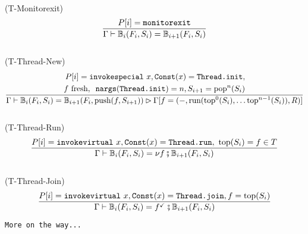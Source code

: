\documentclass{amsart}
\newcommand{\bB}[1]{\mathbb{B}_{#1}}
\newcommand{\Const}{\texttt{Const}}
\numberwithin{equation}{section}
\theoremstyle{plain} %
\theoremstyle{definition}
\theoremstyle{remark}
\begin{document}
\\
(T-Monitorexit)
\begin{equation*}
\frac{P[i] = \text{\texttt{monitorexit}}}
{\Gamma \vdash \bB{i}(F_i, S_i) = \bB{i+1}(F_i, S_i)}
\end{equation*}
\\
(T-Thread-New)
\begin{equation*}
\frac{\begin{aligned}
P[i] = \text{\texttt{invokespecial} } x, \Const{}(x) = \texttt{Thread.init},\\
f \text{ fresh}, \texttt{ nargs}(\texttt{Thread.init}) = n, S_{i+1} = \text{pop}^n(S_i)
\end{aligned}}
{\Gamma \vdash \bB{i}(F_i, S_i) = \bB{i+1}(F_i, \text{push}(f, S_{i+1})) \rhd \Gamma[f = (-, \text{run}(\text{top}^0(S_i), \dots \text{top}^{n-1}(S_i)), R)]}
\end{equation*}
\\
(T-Thread-Run)
\begin{equation*}
\frac{P[i] = \text{\texttt{invokevirtual} } x, \Const{}(x) = \texttt{Thread.run}, \text{ top}(S_i) = f \in T}
{\Gamma \vdash \bB{i}(F_i, S_i) = \nu f \fatsemi \bB{i+1}(F_i, S_i)}
\end{equation*}
\\
(T-Thread-Join)
\begin{equation*}
\frac{P[i] = \text{\texttt{invokevirtual} } x, \Const{}(x) = \texttt{Thread.join}, f = \text{top}(S_i)}
{\Gamma \vdash \bB{i}(F_i, S_i) = f^\checkmark \fatsemi \bB{i+1}(F_i, S_i)}
\end{equation*}

\texttt{More on the way...}
\end{document}
